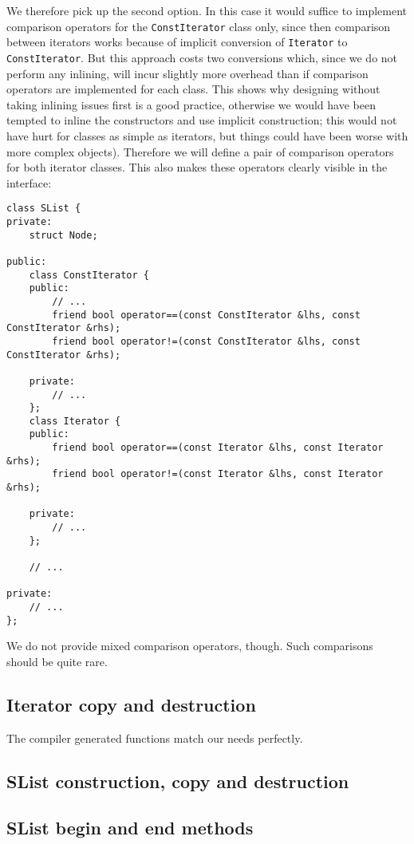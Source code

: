 We therefore pick up the second option. In this case it would suffice to implement comparison operators for the \lstinline!ConstIterator! class only, since then comparison between iterators works because of implicit conversion of \lstinline!Iterator! to \lstinline!ConstIterator!. But this approach costs two conversions which, since we do not perform any inlining, will incur slightly more overhead than if comparison operators are implemented for each class. This shows why designing without taking inlining issues first is a good practice, otherwise we would have been tempted to inline the constructors and use implicit construction; this would not have hurt for classes as simple as iterators, but things could have been worse with more complex objects). Therefore we will define a pair of comparison operators for both iterator classes. This also makes these operators clearly visible in the interface:
\begin{lstlisting}[frame=single, caption={SList.h}]
class SList {
private:
    struct Node;

public:
    class ConstIterator {
    public:            
        // ...
        friend bool operator==(const ConstIterator &lhs, const ConstIterator &rhs);
        friend bool operator!=(const ConstIterator &lhs, const ConstIterator &rhs);
        
    private:
        // ...
    };
    class Iterator {
    public:
        friend bool operator==(const Iterator &lhs, const Iterator &rhs);
        friend bool operator!=(const Iterator &lhs, const Iterator &rhs);
        
    private:
        // ...
    };

    // ...

private:
    // ...
};
\end{lstlisting}
We do not provide mixed comparison operators, though. Such comparisons should be quite rare.

\subsection{Iterator copy and destruction}
The compiler generated functions match our needs perfectly.

\subsection{SList construction, copy and destruction}

\subsection{SList begin and end methods}

